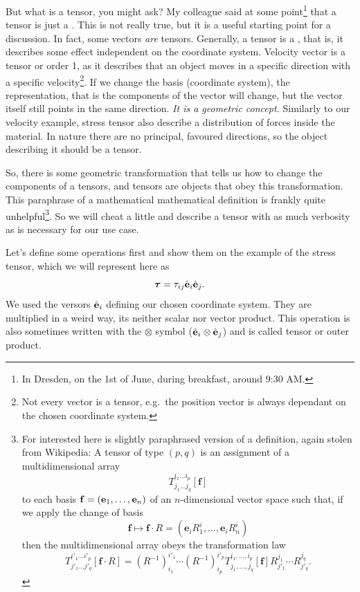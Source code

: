 \documentclass[a4paper]{article}
\begin{document}
But what is a tensor, you might ask? My colleague said at some point\footnote{In Dresden, on the 1st of June, during breakfast, around 9:30 AM.} that a tensor
is just a . This is not really true, but it is a useful starting point for a discussion.
In fact, some vectors
\emph{are} tensors. Generally, a tensor is a , that is,
it describes some effect independent on the coordinate system. Velocity vector
is a tensor or order 1, as it describes that an object moves in a specific direction
with a specific velocity\footnote{Not every vector is a tensor, e.g.\ the
	position vector is always dependant on the chosen coordinate system.}. If we
change the basis (coordinate system), the representation, that is the components
of the vector will change, but the vector itself still points in the same
direction. \emph{It is a geometric concept.} Similarly to our velocity example,
stress tensor also describe a distribution of forces inside the material. In
nature there are no principal, favoured directions, so the object describing it
should be a tensor.

So, there is some geometric transformation
that tells us how to change the components of a tensors, and tensors
are objects that obey this transformation.
This paraphrase of a mathematical mathematical definition is
frankly quite unhelpful\footnote{%
For interested here is slightly paraphrased version of a definition,
again stolen from Wikipedia: A tensor of type \((p,q)\) is an assignment
of a multidimensional array
\[
	T^{i_1\dots i_p}_{j_{1}\dots j_{q}}[\mathbf{f}]
\]
to each basis \(\vb{f} = (\vb{e}_1, \dots, \vb{e}_n)\) of an \(n\)-dimensional
vector space such that, if we apply the change of basis
\[
	\mathbf{f}\mapsto \mathbf{f}\cdot R = \left( \mathbf{e}_i R^i_1, \dots, \mathbf{e}_i R^i_n \right)
\]
then the multidimensional array obeys the transformation law
\[
	T^{i'_1\dots i'_p}_{j'_1\dots j'_q}[\mathbf{f} \cdot R] = \left(R^{-1}\right)^{i'_1}_{i_1} \cdots \left(R^{-1}\right)^{i'_p}_{i_p}
	T^{i_1, \ldots, i_p}_{j_1, \ldots, j_q}[\mathbf{f}]
	R^{j_1}_{j'_1}\cdots R^{j_q}_{j'_q} .
\]
}.
So we will cheat a little
and describe a tensor with as much verbosity as is necessary for our use case.

Let's define some operations first and show them on the example of the stress
tensor, which we will represent here as
\[
	\bm{\tau} = \tau_{ij}\hat{\vb{e}}_i \hat{\vb{e}}_j.
\]
We used the versors \(\hat{\vb{e}}_i\) defining our chosen coordinate system.
They are multiplied in a weird way, its neither scalar nor vector product. This
operation is also sometimes written with
the \(\otimes\) symbol (\(\hat{\vb{e}}_i \otimes \hat{\vb{e}}_j\)) and
is called tensor or outer product.
\end{document}
